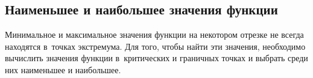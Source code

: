 \subsection{Наименьшее и наибольшее значения функции}
Минимальное и максимальное значения функции на некотором отрезке не всегда находятся в~точках экстремума.
Для того, чтобы найти эти значения, необходимо вычислить значения функции в~критических и граничных точках и выбрать среди них наименьшее и наибольшее.